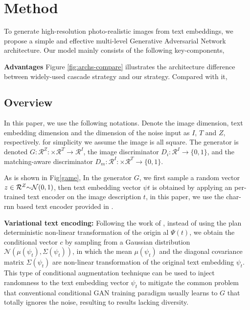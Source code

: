 \documentclass[10pt,twocolumn,letterpaper]{article}
\begin{document}
\section{Method}
To generate high-resolution photo-realistic images from text embeddings, we propose a simple and effective multi-level Generative Adversarial Network architecture. Our model mainly consists of the following key-components,



\textbf{Advantages} Figure \ref{fig:archs-compare} illustrates the architecture difference between widely-used cascade strategy \cite{han2017stackgan,denton2015deep} and our strategy. Compared with it, 

\subsection{Overview}
In this paper, we use the following notations. Denote the image dimension, text embedding dimension and the dimension of the noise input as $I$, $T$ and $Z$, respectively. for simplicity we assume the image is all square. The generator is denoted $G: \mathcal{R}^{Z}: \times \mathcal{R}^{T}\rightarrow\mathcal{R}^{I}$, the image discriminator $D_i: \mathcal{R}^{I}\rightarrow\{0, 1\}$, and the matching-aware discriminator $D_m: \mathcal{R}^{I}: \times \mathcal{R}^{T}\rightarrow\{0, 1\}$.

As is shown in Fig\ref{game}, In the generator $G$, we first sample a random vector $z\in \mathcal{R}^{Z} \scriptsize{\sim} \mathcal{N}(0,1)$, then text embedding vector $\psi{t}$ is obtained by applying an per-trained text encoder on the image description $t$, in this paper, we use the char-rnn based text encoder provided in \cite{reed2016generative}. 

\textbf{Variational text encoding: } Following the work of \cite{han2017stackgan}, instead of using the plan deterministic non-linear transformation of the origin al $\Psi(t)$, we obtain the conditional vector $c$ by sampling from a Gaussian distribution $\mathcal{N}(\mu(\psi_t), \Sigma(\psi_t) )$, in which the mean $\mu(\psi_t)$ and the diagonal covariance matrix $\Sigma(\psi_t)$ are non-linear transformation of the original text embedding $\psi_t$. This type of conditional augmentation technique can be used to inject randomness to the text embedding vector $\psi_t$ to mitigate the common problem that conventional conditional GAN training paradigm usually learns to $G$ that totally ignores the noise, resulting to results lacking diversity. 
\end{document}

